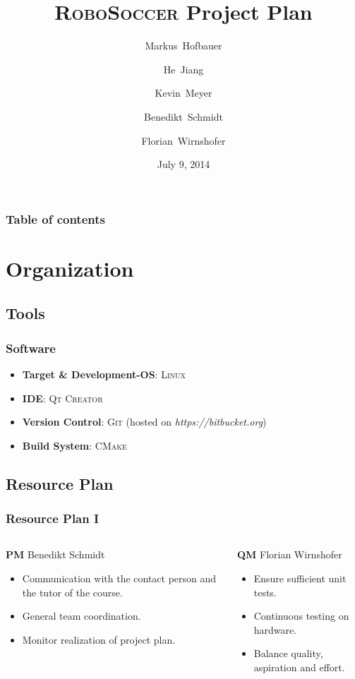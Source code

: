 \documentclass[hyperref={pdfpagelabels=false},compress]{beamer}
\title{\textsc{RoboSoccer} Project Plan}
\author[Hofbauer, Jiang, Meyer, Schmidt, Wirnshofer]{
  Markus~Hofbauer \and
  He~Jiang \and
  Kevin~Meyer \and
  Benedikt~Schmidt \and
  Florian~Wirnshofer
}
\institute
{
	Technische Universität München, Germany
}
\date{July 9, 2014}
\begin{document}
\begin{frame}
	\titlepage
\end{frame}

\begin{frame}
	\frametitle{Table of contents}
	\tableofcontents
\end{frame}

\section{Organization}
\subsection{Tools}
\begin{frame}
	\frametitle{Software}
	\begin{itemize}
		\item  \textbf{Target \& Development-OS}: \textsc{Linux}
		\item  \textbf{IDE}: \textsc{Qt Creator}
		\item  \textbf{Version Control}: \textsc{Git} (hosted on \textit{https://bitbucket.org})
		\item  \textbf{Build System}: \textsc{CMake}
	\end{itemize}
\end{frame}

\subsection{Resource Plan}
\begin{frame}
	\frametitle{Resource Plan I}
	\begin{columns}[t]
		\begin{column}{0.50\textwidth}
			\begin{block}{\textbf{PM} Benedikt Schmidt}
				\begin{itemize}
					\item Communication with the contact person and the tutor of the course.
					\item General team coordination.
					\item Monitor realization of project plan.
				\end{itemize}
			\end{block}
		\end{column}

		\begin{column}{0.50\textwidth}
			\begin{block}{\textbf{QM} Florian Wirnshofer}
				\begin{itemize}
					\item Ensure sufficient unit tests.
					\item Continuous testing on hardware.
					\item Balance quality, aspiration and effort.
				\end{itemize}
			\end{block}
		\end{column}
	\end{columns}
\end{frame}
\end{document}
